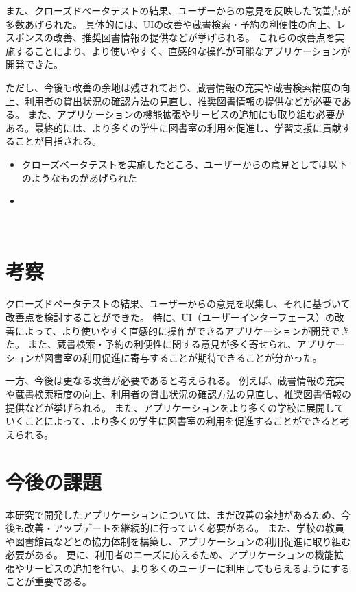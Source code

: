 \documentclass[pdflatex,ja=standard,twocolumn]{bxjsarticle}
\begin{document}
また、クローズドベータテストの結果、ユーザーからの意見を反映した改善点が多数あげられた。
具体的には、UIの改善や蔵書検索・予約の利便性の向上、レスポンスの改善、推奨図書情報の提供などが挙げられる。
これらの改善点を実施することにより、より使いやすく、直感的な操作が可能なアプリケーションが開発できた。

ただし、今後も改善の余地は残されており、蔵書情報の充実や蔵書検索精度の向上、利用者の貸出状況の確認方法の見直し、推奨図書情報の提供などが必要である。
また、アプリケーションの機能拡張やサービスの追加にも取り組む必要がある。最終的には、より多くの学生に図書室の利用を促進し、学習支援に貢献することが目指される。
\begin{itemize}
　\item クローズベータテストを実施したところ、ユーザーからの意見としては以下のようなものがあげられた
　\item 
\end{itemize}
　
\section{考察}
クローズドベータテストの結果、ユーザーからの意見を収集し、それに基づいて改善点を検討することができた。
特に、UI（ユーザーインターフェース）の改善によって、より使いやすく直感的に操作ができるアプリケーションが開発できた。
また、蔵書検索・予約の利便性に関する意見が多く寄せられ、アプリケーションが図書室の利用促進に寄与することが期待できることが分かった。

一方、今後は更なる改善が必要であると考えられる。
例えば、蔵書情報の充実や蔵書検索精度の向上、利用者の貸出状況の確認方法の見直し、推奨図書情報の提供などが挙げられる。
また、アプリケーションをより多くの学校に展開していくことによって、より多くの学生に図書室の利用を促進することができると考えられる。
\section{今後の課題}
本研究で開発したアプリケーションについては、まだ改善の余地があるため、今後も改善・アップデートを継続的に行っていく必要がある。
また、学校の教員や図書館員などとの協力体制を構築し、アプリケーションの利用促進に取り組む必要がある。
更に、利用者のニーズに応えるため、アプリケーションの機能拡張やサービスの追加を行い、より多くのユーザーに利用してもらえるようにすることが重要である。
\end{document}
